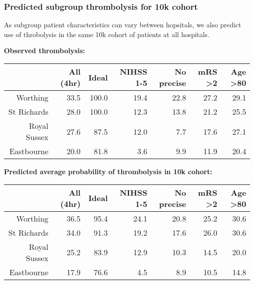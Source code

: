\begin{frame}
\frametitle{Predicted subgroup thrombolysis for 10k cohort}

As subgroup patient characteristics can vary between hopsitals, we also predict use of throbolysis in the same 10k cohort of patients at all hospitals.

\vspace{4mm}

\normalsize
\textbf{Observed thrombolysis:}
\scriptsize
\begin{table}[]
\begin{tabular}{rrrrrrr}
\textbf{}    & All (4hr) & Ideal & NIHSS 1-5 & No precise & mRS \textgreater 2 & Age \textgreater 80 \\
\hline
Worthing     & 33.5         & 100.0 & 19.4      & 22.8       & 27.2               & 29.1                \\
St Richards  & 28.0         & 100.0 & 12.3      & 13.8       & 21.2               & 25.5                \\
Royal Sussex & 27.6         & 87.5  & 12.0      & 7.7        & 17.6               & 27.1                \\
Eastbourne   & 20.0         & 81.8  & 3.6       & 9.9        & 11.9               & 20.4               
\end{tabular}
\end{table}

\vspace{2mm}
\normalsize
\textbf{Predicted average probability of thrombolysis in 10k cohort:}
\scriptsize
\begin{table}[]
\begin{tabular}{rrrrrrr}
\textbf{}    & All (4hr) & Ideal & NIHSS 1-5 & No precise & mRS \textgreater 2 & Age \textgreater 80 \\
\hline
Worthing     & 36.5         & 95.4  & 24.1      & 20.8             & 25.2               & 30.6                \\
St Richards  & 34.0         & 91.3  & 19.2      & 17.6             & 26.0               & 30.6                \\
Royal Sussex & 25.2         & 83.9  & 12.9      & 10.3             & 14.5               & 20.0                \\
Eastbourne  & 17.9         & 76.6  & 4.5       & 8.9              & 10.5               & 14.8               
\end{tabular}
\end{table}

\end{frame}